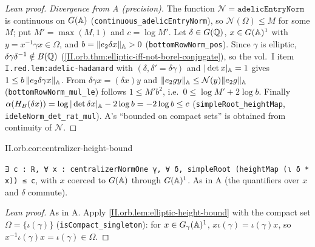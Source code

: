 \begin{proof}[Lean proof]
\emph{Divergence from A (precision).} The function $\mathcal N=\texttt{adelicEntryNorm}$ is continuous on $G(\mathbb{A})$ (\texttt{continuous\_adelicEntryNorm}), so $\mathcal N(\Omega)\le M$ for some $M$; put $M'=\max(M,1)$ and $c=\log M'$. Let $\delta\in G(\mathbb{Q})$, $x\in G(\mathbb{A})^1$ with $y=x^{-1}\gamma x\in\Omega$, and $b=\lVert e_2\delta x\rVert_{\mathbb{A}}>0$ (\texttt{bottomRowNorm\_pos}). Since $\gamma$ is elliptic, $\delta\gamma\delta^{-1}\notin B(\mathbb{Q})$ (\cref{II.orb.thm:elliptic-iff-not-borel-conjugate}), so the vol.~I item \texttt{I.red.lem:adelic-hadamard} with $(\delta,\delta'=\delta\gamma)$ and $|\det x|_{\mathbb{A}}=1$ gives $1\le b\,\lVert e_2\delta\gamma x\rVert_{\mathbb{A}}$. From $\delta\gamma x=(\delta x)y$ and $\lVert e_2gy\rVert_{\mathbb{A}}\le\mathcal N(y)\lVert e_2g\rVert_{\mathbb{A}}$ (\texttt{bottomRowNorm\_mul\_le}) follows $1\le M'b^2$, i.e.\ $0\le\log M'+2\log b$. Finally $\alpha(H_B(\delta x))=\log|\det\delta x|_{\mathbb{A}}-2\log b=-2\log b\le c$ (\texttt{simpleRoot\_heightMap}, \texttt{ideleNorm\_det\_rat\_mul}). A's ``bounded on compact sets'' is obtained from continuity of $\mathcal N$.
\end{proof}

\begin{corollary}
\end{corollary}
\begin{tfformal}{II.orb.cor:centralizer-height-bound}
\begin{tffidelity}
\texttt{∃ c : ℝ, ∀ x : centralizerNormOne γ, ∀ δ, simpleRoot (heightMap (ι δ * x)) ≤ c}, with $x$ coerced to $G(\mathbb{A})$ through $G(\mathbb{A})^1$. As in A (the quantifiers over $x$ and $\delta$ commute).
\end{tffidelity}
\end{tfformal}
\begin{proof}[Lean proof]
As in A. Apply \cref{II.orb.lem:elliptic-height-bound} with the compact set $\Omega=\{\iota(\gamma)\}$ (\texttt{isCompact\_singleton}): for $x\in G_\gamma(\mathbb{A})^1$, $x\iota(\gamma)=\iota(\gamma)x$, so $x^{-1}\iota(\gamma)x=\iota(\gamma)\in\Omega$.
\end{proof}

